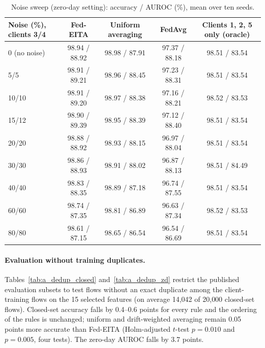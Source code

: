 \documentclass[pdflatex,sn-mathphys-num]{sn-jnl}
\begin{document}
{{{{{{\begin{table}[!htbp]\centering
\caption{Noise sweep (zero-day setting): accuracy / AUROC (\%), mean over ten seeds.}\label{tab:a_noise}
\scriptsize
\setlength{\tabcolsep}{4pt}
\begin{tabular}{lcccc}\toprule
Noise (\%), clients 3/4 & Fed-EITA & Uniform averaging & FedAvg & Clients 1, 2, 5 only (oracle) \\ \midrule
0 (no noise) & 98.94 / 88.92 & 98.98 / 87.91 & 97.37 / 88.18 & 98.51 / 83.54 \\
5/5 & 98.91 / 89.21 & 98.96 / 88.45 & 97.23 / 88.31 & 98.51 / 83.54 \\
10/10 & 98.91 / 89.20 & 98.97 / 88.38 & 97.16 / 88.21 & 98.52 / 83.53 \\
15/12 & 98.90 / 89.39 & 98.95 / 88.39 & 97.12 / 88.40 & 98.51 / 83.54 \\
20/20 & 98.88 / 88.92 & 98.93 / 88.15 & 96.97 / 88.04 & 98.51 / 83.54 \\
30/30 & 98.86 / 88.93 & 98.91 / 88.02 & 96.87 / 88.13 & 98.51 / 84.49 \\
40/40 & 98.83 / 88.35 & 98.89 / 87.18 & 96.74 / 87.55 & 98.51 / 83.54 \\
60/60 & 98.74 / 87.35 & 98.81 / 86.89 & 96.63 / 87.34 & 98.52 / 83.53 \\
80/80 & 98.61 / 87.15 & 98.65 / 86.54 & 96.54 / 86.69 & 98.51 / 83.54 \\
\bottomrule\end{tabular}
\end{table}

\paragraph{Evaluation without training duplicates.} Tables~\ref{tab:a_dedup_closed} and~\ref{tab:a_dedup_zd} restrict the published evaluation subsets to test flows without an exact duplicate among the client-training flows on the 15 selected features (on average 14{,}042 of 20{,}000 closed-set flows). Closed-set accuracy falls by 0.4--0.6 points for every rule and the ordering of the rules is unchanged; uniform and drift-weighted averaging remain 0.05 points more accurate than Fed-EITA (Holm-adjusted $t$-test $p=0.010$ and $p=0.005$, four tests). The zero-day AUROC falls by 3.7 points.

}}}}}}
\end{document}
